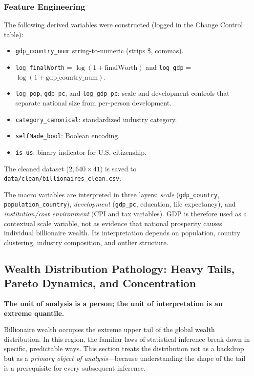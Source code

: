 \documentclass[a4paper,10pt]{article}
\begin{document}
\subsubsection{Feature Engineering}
The following derived variables were constructed (logged in the Change Control table):
\begin{itemize}
  \item \texttt{gdp\_country\_num}: string-to-numeric (strips \$, commas).
  \item \texttt{log\_finalWorth} = $\log(1 + \mathrm{finalWorth})$ and \texttt{log\_gdp} = $\log(1 + \mathrm{gdp\_country\_num})$.
  \item \texttt{log\_pop}, \texttt{gdp\_pc}, and \texttt{log\_gdp\_pc}: scale and development controls that separate national size from per-person development.
  \item \texttt{category\_canonical}: standardized industry category.
  \item \texttt{selfMade\_bool}: Boolean encoding.
  \item \texttt{is\_us}: binary indicator for U.S. citizenship.
\end{itemize}
The cleaned dataset ($2{,}640 \times 41$) is saved to \texttt{data/clean/billionaires\_clean.csv}.

The macro variables are interpreted in three layers: \emph{scale} (\texttt{gdp\_country}, \texttt{population\_country}), \emph{development} (\texttt{gdp\_pc}, education, life expectancy), and \emph{institution/cost environment} (CPI and tax variables). GDP is therefore used as a contextual scale variable, not as evidence that national prosperity causes individual billionaire wealth. Its interpretation depends on population, country clustering, industry composition, and outlier structure.

\subsection{Wealth Distribution Pathology: Heavy Tails, Pareto Dynamics, and Concentration}\label{sec:desc}

\textbf{The unit of analysis is a person; the unit of interpretation is an extreme quantile.}

Billionaire wealth occupies the extreme upper tail of the global wealth distribution. In this region, the familiar laws of statistical inference break down in specific, predictable ways. This section treats the distribution not as a backdrop but as a \emph{primary object of analysis}---because understanding the shape of the tail is a prerequisite for every subsequent inference.
\end{document}
